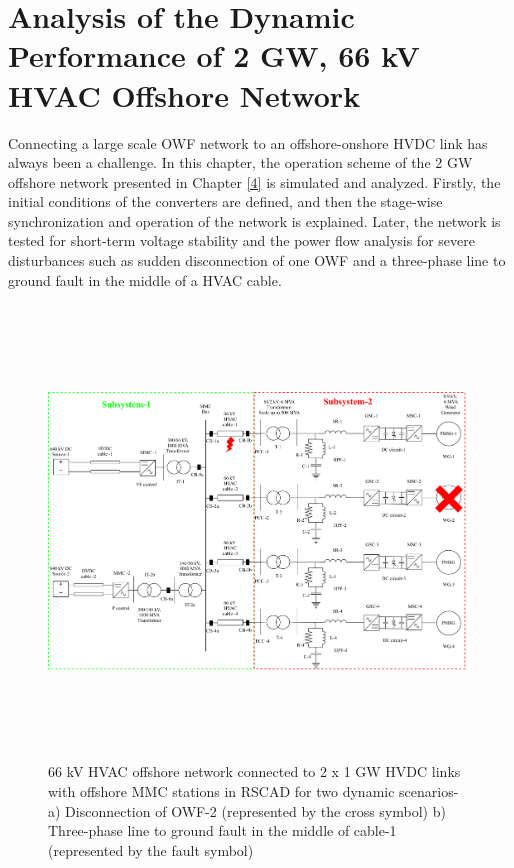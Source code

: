 \chapter{Analysis of the Dynamic Performance of 2 GW, 66 kV HVAC Offshore Network}\label{5}

Connecting a large scale \gls{OWF} network to an offshore-onshore \gls{HVDC} link has always been a challenge. In this chapter, the operation scheme of the 2 GW offshore network presented in Chapter \ref{4} is simulated and analyzed. Firstly, the initial conditions of the converters are defined, and then the stage-wise synchronization and operation of the network is explained. Later, the network is tested for short-term voltage stability and the power flow analysis for severe disturbances such as sudden disconnection of one \gls{OWF} and a three-phase line to ground fault in the middle of a \gls{HVAC} cable.

\begin{figure}[H]
\centering
    \includegraphics[height = 12cm,width = \textwidth]{Diagrams/Chapter_5/WT4_MMC2_fault.pdf}
    \caption{66 kV HVAC offshore network connected to 2 x 1 GW HVDC links with offshore MMC stations in RSCAD for two dynamic scenarios- \newline 
    a) Disconnection of OWF-2 (represented by the cross symbol) \newline 
    b) Three-phase line to ground fault in the middle of cable-1 (represented by the fault symbol)}
    \label{fig:WT4_MMC2_Chap5}
\end{figure}

